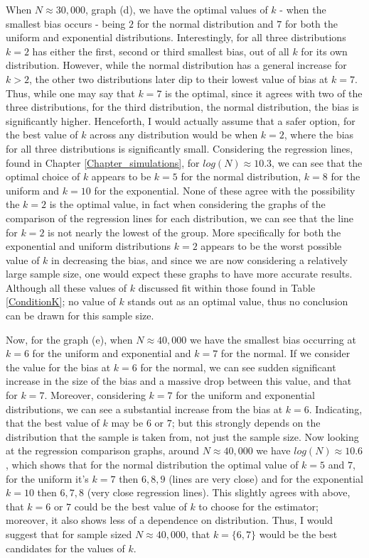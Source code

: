 \documentclass[12pt]{report}
\begin{document}
When $N \approx 30,000$, graph (d), we have the optimal values of $k$ - when the smallest bias occurs - being $2$ for the normal distribution and $7$ for both the uniform and exponential distributions. Interestingly, for all three distributions $k=2$ has either the first, second or third smallest bias, out of all $k$ for its own distribution. However, while the normal distribution has a general increase for $k > 2$, the other two distributions later dip to their lowest value of bias at $k=7$. Thus, while one may say that $k=7$ is the optimal, since it agrees with two of the three distributions, for the third distribution, the normal distribution, the bias is significantly higher. Henceforth, I would actually assume that a safer option, for the best value of $k$ across any distribution would be when $k=2$, where the bias for all three distributions is significantly small. Considering the regression lines, found in Chapter \ref{Chapter_simulations}, for $log(N) \approx 10.3$, we can see that the optimal choice of $k$ appears to be $k=5$ for the normal distribution, $k=8$ for the uniform and $k=10$ for the exponential. None of these agree with the possibility the $k=2$ is the optimal value, in fact when considering the graphs of the comparison of the regression lines for each distribution, we can see that the line for $k=2$ is not nearly the lowest of the group. More specifically for both the exponential and uniform distributions $k=2$ appears to be the worst possible value of $k$ in decreasing the bias, and since we are now considering a relatively large sample size, one would expect these graphs to have more accurate results. Although all these values of $k$ discussed fit within those found in Table \ref{ConditionK}; no value of $k$ stands out as an optimal value, thus no conclusion can be drawn for this sample size.


Now, for the graph (e), when $N \approx 40,000$ we have the smallest bias occurring at $k=6$ for the uniform and exponential and $k=7$ for the normal. If we consider the value for the bias at $k=6$ for the normal, we can see sudden significant increase in the size of the bias and a massive drop between this value, and that for $k=7$. Moreover, considering $k=7$ for the uniform and exponential distributions, we can see a substantial increase from the bias at $k=6$. Indicating, that the best value of $k$ may be $6$ or $7$; but this strongly depends on the distribution that the sample is taken from, not just the sample size. Now looking at the regression comparison graphs, around $N \approx 40,000$ we have $log(N) \approx 10.6$, which shows that for the normal distribution the optimal value of $k=5$ and $7$, for the uniform it's $k=7$ then $6, 8, 9$ (lines are very close) and for the exponential $k=10$ then $6, 7, 8$ (very close regression lines). This slightly agrees with above, that $k=6$ or $7$ could be the best value of $k$ to choose for the estimator; moreover, it also shows less of a dependence on distribution. Thus, I would suggest that for sample sized $N \approx 40,000$, that $k= \{6, 7\}$ would be the best candidates for the values of $k$.
\end{document}
